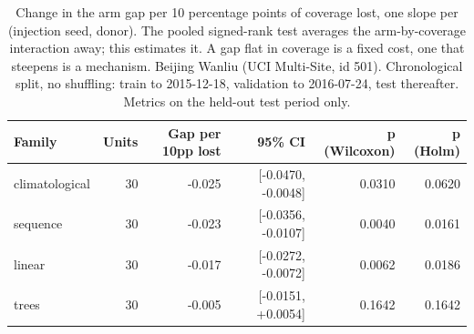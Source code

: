 \begin{table}[htbp]
\caption{Change in the arm gap per 10 percentage points of coverage lost, one slope per (injection seed, donor). The pooled signed-rank test averages the arm-by-coverage interaction away; this estimates it. A gap flat in coverage is a fixed cost, one that steepens is a mechanism. Beijing Wanliu (UCI Multi-Site, id 501). Chronological split, no shuffling: train to 2015-12-18, validation to 2016-07-24, test thereafter. Metrics on the held-out test period only.}
\label{tab:donor_dose_response}
\begin{tabular}{lrrrrr}
\toprule
Family & Units & Gap per 10pp lost & 95\% CI & p (Wilcoxon) & p (Holm) \\
\midrule
climatological & 30 & -0.025 & [-0.0470, -0.0048] & 0.0310 & 0.0620 \\
sequence & 30 & -0.023 & [-0.0356, -0.0107] & 0.0040 & 0.0161 \\
linear & 30 & -0.017 & [-0.0272, -0.0072] & 0.0062 & 0.0186 \\
trees & 30 & -0.005 & [-0.0151, +0.0054] & 0.1642 & 0.1642 \\
\bottomrule
\end{tabular}
\end{table}
